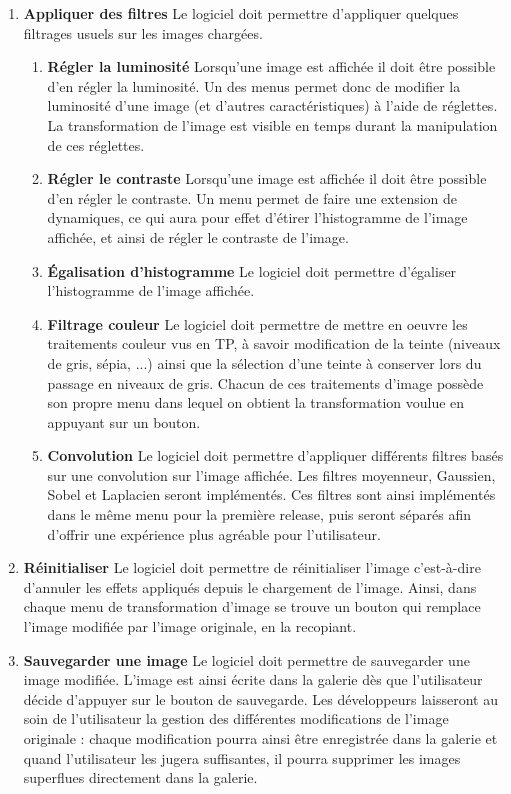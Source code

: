 \documentclass{article}
\begin{document}
\begin{enumerate}
\item {\bf Appliquer des filtres} Le logiciel doit permettre d'appliquer quelques filtrages usuels sur les images chargées.
  \begin{enumerate}
  \item {\bf Régler la luminosité} Lorsqu'une image est affichée il doit être possible d'en régler la luminosité. Un des menus permet donc de modifier la luminosité d'une image (et d'autres caractéristiques) à l'aide de réglettes. La transformation de l'image est visible en temps durant la manipulation de ces réglettes.  
  \item {\bf Régler le contraste} Lorsqu'une image est affichée il doit être possible d'en régler le contraste. Un menu permet de faire une extension de dynamiques, ce qui aura pour effet d'étirer l'histogramme de l'image affichée, et ainsi de régler le contraste de l'image.
  \item {\bf Égalisation d'histogramme} Le logiciel doit permettre d'égaliser l'histogramme de l'image affichée.
  \item {\bf Filtrage couleur} Le logiciel doit permettre de mettre en oeuvre les traitements couleur vus en TP, à savoir modification de la teinte (niveaux de gris, sépia, ...) ainsi que la sélection d'une teinte à conserver lors du passage en niveaux de gris. Chacun de ces traitements d'image possède son propre menu dans lequel on obtient la transformation voulue en appuyant sur un bouton.
  \item {\bf Convolution} Le logiciel doit permettre d'appliquer différents filtres basés sur une convolution sur l'image affichée. Les filtres moyenneur, Gaussien, Sobel et Laplacien seront implémentés. Ces filtres sont ainsi implémentés dans le même menu pour la première release, puis seront séparés afin d'offrir une expérience plus agréable pour l'utilisateur.
  \end{enumerate}

\item {\bf Réinitialiser} Le logiciel doit permettre de réinitialiser l'image c'est-à-dire d'annuler les effets appliqués depuis le chargement de l'image. Ainsi, dans chaque menu de transformation d'image se trouve un bouton qui remplace l'image modifiée par l'image originale, en la recopiant. 

\item {\bf Sauvegarder une image} Le logiciel doit permettre de sauvegarder une image modifiée. L'image est ainsi écrite dans la galerie dès que l'utilisateur décide d'appuyer sur le bouton de sauvegarde. Les développeurs laisseront au soin de l'utilisateur la gestion des différentes modifications de l'image originale : chaque modification pourra ainsi être enregistrée dans la galerie et quand l'utilisateur les jugera suffisantes, il pourra supprimer les images superflues directement dans la galerie.
  \setcounter{numeroO}{\theenumi}
\end{enumerate}
\end{document}
